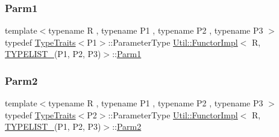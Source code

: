 \mbox{\label{classUtil_1_1FunctorImpl_3_01R_00_01TYPELIST__3_07P1_00_01P2_00_01P3_08_4_af62467f5d0a091d03f5db9c7fbeb1f96}} 
\subsubsection{\texorpdfstring{Parm1}{Parm1}\hspace{0.1cm}{\footnotesize\ttfamily [2/2]}}
{\footnotesize\ttfamily template$<$typename R , typename P1 , typename P2 , typename P3 $>$ \\
typedef \mbox{\hyperlink{classUtil_1_1TypeTraits}{Type\+Traits}}$<$P1$>$\+::Parameter\+Type \mbox{\hyperlink{classUtil_1_1FunctorImpl}{Util\+::\+Functor\+Impl}}$<$ R, \mbox{\hyperlink{install_2include_2adat_2typelist_8h_a0309f68a543c5c0994f9edc0e56dc59f}{T\+Y\+P\+E\+L\+I\+S\+T\+\_}}(P1, P2, P3)$>$\+::\mbox{\hyperlink{structUtil_1_1Private_1_1FunctorImplBase_a9d61e693d6c616dea5bd9d9073c7d21a}{Parm1}}}

\mbox{\label{classUtil_1_1FunctorImpl_3_01R_00_01TYPELIST__3_07P1_00_01P2_00_01P3_08_4_a0f99a7ea311c3cc8934098ce9fe769c1}} 
\subsubsection{\texorpdfstring{Parm2}{Parm2}\hspace{0.1cm}{\footnotesize\ttfamily [1/2]}}
{\footnotesize\ttfamily template$<$typename R , typename P1 , typename P2 , typename P3 $>$ \\
typedef \mbox{\hyperlink{classUtil_1_1TypeTraits}{Type\+Traits}}$<$P2$>$\+::Parameter\+Type \mbox{\hyperlink{classUtil_1_1FunctorImpl}{Util\+::\+Functor\+Impl}}$<$ R, \mbox{\hyperlink{install_2include_2adat_2typelist_8h_a0309f68a543c5c0994f9edc0e56dc59f}{T\+Y\+P\+E\+L\+I\+S\+T\+\_}}(P1, P2, P3)$>$\+::\mbox{\hyperlink{structUtil_1_1Private_1_1FunctorImplBase_a554085cd798ef14838a59b528f0feb2e}{Parm2}}}


